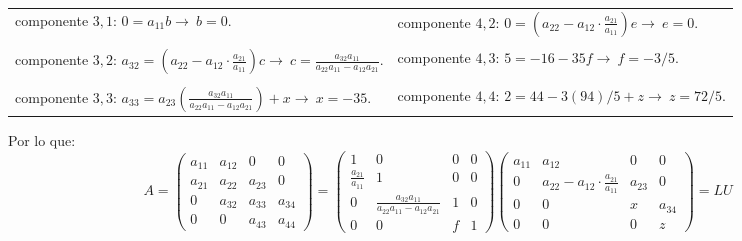 \documentclass[11pt,letterpaper]{article}
\begin{document}
\begin{enumerate}
\begin{table}[H]
\begin{tabular}{l|l}
componente $3,1$: $0=a_{11}b \rightarrow \ b=0.$ & componente $4,2$: $0=\left(a_{22}-a_{12}\cdot \frac{a_{21}}{a_{11}}\right) e \rightarrow \ e=0.$\\ \\
componente $3,2$: $a_{32}=(a_{22}-a_{12}\cdot \left. \frac{a_{21}}{a_{11}}\right.)c \rightarrow \ c=\frac{a_{32}a_{11}}{a_{22}a_{11}-a_{12}a_{21}}.$ & componente $4,3$: $5=-16-35f \rightarrow \ f=-3/5.$\\ \\
componente $3,3$: $a_{33}=a_{23}\left(\frac{a_{32}a_{11}}{a_{22}a_{11}-a_{12}a_{21}}\right)+x \rightarrow \ x=-35.$ & componente $4,4$: $2=44-3(94)/5+z \rightarrow \ z=72/5.$\\ 
\end{tabular}
\end{table}
Por lo que:
\begin{equation*}
A=\left(\begin{array}{cccc}
a_{11} & a_{12} &   0    &    0  \\
a_{21} & a_{22} & a_{23} &    0  \\
    0  & a_{32} & a_{33} & a_{34}\\
    0  &   0    & a_{43} & a_{44}
\end{array} \right)=
\left(\begin{array}{cccc}
 1 &  0 &  0 & 0\\
 \frac{a_{21}}{a_{11}} &  1 &  0 & 0\\
 0 &  \frac{a_{32}a_{11}}{a_{22}a_{11}-a_{12}a_{21}} &  1 & 0\\
 0 &  0 &  f & 1
\end{array} \right) \left(\begin{array}{cccc}
 a_{11} &  a_{12} & 0 & 0\\
 0 &  a_{22}-a_{12} \cdot \frac{a_{21}}{a_{11}}&  a_{23} & 0\\
 0 &  0 &  x & a_{34}\\
 0 &  0 &  0 & z
\end{array} \right)=LU
\end{equation*}
\end{enumerate}
\end{document}

